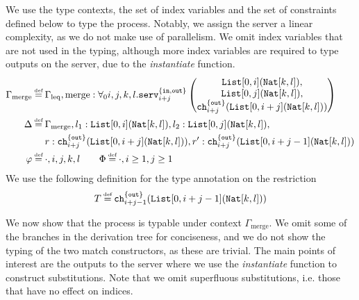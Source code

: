 %
We use the type contexts, the set of index variables and the set of constraints defined below to type the process. Notably, we assign the server a linear complexity, as we do not make use of parallelism. We omit index variables that are not used in the typing, although more index variables are required to type outputs on the server, due to the \textit{instantiate} function.
%
\begin{align*}
    \Gamma_{\text{merge}}\defeq&\; \Gamma_{\text{leq}},\text{merge} : \forall_0{i,j,k,l }.\texttt{serv}^{\{\texttt{in},\texttt{out}\}}_{i+j}\left(
    \begin{matrix}
    \texttt{List}[0,i](\texttt{Nat}[k,l]),\\
    \texttt{List}[0,j](\texttt{Nat}[k,l]),\\
    \texttt{ch}^{\{\texttt{out}\}}_{i+j}(\texttt{List}[0,i+j](\texttt{Nat}[k,l]))\end{matrix}\right) \\
    \Delta \defeq&\; \Gamma_{\text{merge}}, l_1 : \texttt{List}[0,i](\texttt{Nat}[k,l]), l_2 : \texttt{List}[0,j](\texttt{Nat}[k,l]),\\ 
    &\;r : \texttt{ch}^{\{\texttt{out}\}}_{i+j}(\texttt{List}[0,i+j](\texttt{Nat}[k,l])),r' : \texttt{ch}^{\{\texttt{out}\}}_{i+j}(\texttt{List}[0,i+j-1](\texttt{Nat}[k,l]))\\
    \varphi \defeq&\; \cdot,i,j,k,l\quad\quad \Phi \defeq \cdot,i\geq 1,j\geq 1
\end{align*}
%
We use the following definition for the type annotation on the restriction
\begin{align*}
    T \defeq \texttt{ch}^{\{\texttt{out}\}}_{i+j-1}(\texttt{List}[0,i+j-1](\texttt{Nat}[k,l]))
\end{align*}

We now show that the process is typable under context $\Gamma_{\text{merge}}$. We omit some of the branches in the derivation tree for conciseness, and we do not show the typing of the two match constructors, as these are trivial. The main points of interest are the outputs to the server where we use the \textit{instantiate} function to construct substitutions. Note that we omit superfluous substitutions, i.e. those that have no effect on indices.

